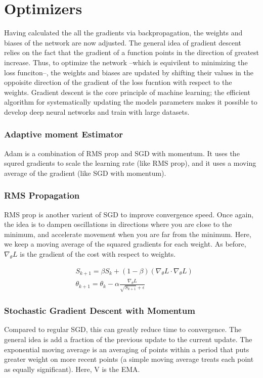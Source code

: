 \section{Optimizers}
Having calculated the all the gradients via backpropagation, the weights and biases of the network are now adjusted. The general idea of gradient descent relies on the fact that the gradient of a function points in the direction of greatest increase. Thus, to optimize the network --which is equivilent to minimizing the loss funciton--, the weights and biases are updated by shifting their values in the oppoisite direction of the gradient of the loss fucntion with respect to the weights. Gradient descent is the core principle of machine learning; the efficient algorithm for systematically updating the models parameters
makes it possible to develop deep neural networks and train with large datasets.

\subsubsection{Adaptive moment Estimator}
Adam is a combination of RMS prop and SGD with momentum. It uses the squred gradients to scale the learning rate (like RMS prop), and it uses a moving average of the gradient (like SGD with momentum).

\subsubsection{RMS Propagation}
RMS prop is another varient of SGD to improve convergence speed. Once again, the idea is to dampen oscillations in directions where you are close to the minimum, and accelerate movement when you are far from the minimum. Here, we keep a moving average of the squared gradients for each weight. As before, $\nabla_\theta L$ is the gradient of the cost with respect to weights.

\begin{align}
    \label{eqn:RMS_Prop}
    & S_{k+1} = \beta S_k + (1 - \beta)(\nabla_\theta L \cdot \nabla_\theta L) \\
    & \theta_{k+1} = \theta_k - \alpha \frac{\nabla_\theta L}{\sqrt{S_{k+1}} + \epsilon}
\end{align}

\subsubsection{Stochastic Gradient Descent with Momentum}
Compared to regular SGD, this can greatly reduce time to convergence. The general idea is add a fraction of the previous update to the current update. The exponential moving average is an averaging of points within a period that puts greater weight on more recent points (a simple moving average treats each point as equally significant). Here, V is the EMA.

